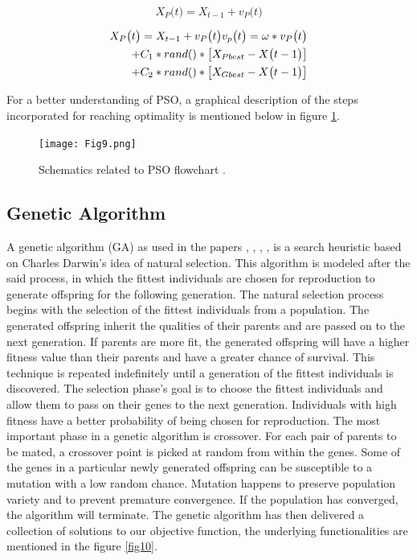 \documentclass[default,iicol]{sn-jnl}
\theoremstyle{thmstyleone}
\theoremstyle{thmstyletwo}
\theoremstyle{thmstylethree}
\begin{document}
\begin{equation}
\displaystyle{X_{P} \big(t\big) = X_{t-1}+ v_{P} \big(t\big)}
\end{equation}

\begin{equation}
\begin{split}
X_{P} \big(t\big) = X_{t-1}+ v_{P} \big(t\big)
 v_{p} \big(t\big) =  \omega  \ast v_{P} \big(t\big) \cr + C_{1} \ast rand() \ast \big[ X_{Pbest} -  X \big(t-1\big) \big] \cr +  C_{2}  \ast rand () 
\ast   \big[ X_{Gbest} - X \big(t-1\big) \big]
\end{split}
\end{equation}
     
For a better understanding of PSO, a graphical description of the steps incorporated for reaching optimality is mentioned below in figure \ref{fig9}.

\begin{figure}[ht]
\centering
\texttt{[image: Fig9.png]}
\caption{Schematics related to PSO flowchart \cite{bib18}.}\label{fig9}
\end{figure}

\subsection{Genetic Algorithm}\label{subsec9}

A genetic algorithm (GA) as used in the papers \cite{bib19}, \cite{bib43}, \cite{bib42}, \cite{bib41}, \cite{bib40} is a search heuristic based on Charles Darwin's idea of natural selection. This algorithm is modeled after the said process, in which the fittest individuals are chosen for reproduction to generate offspring for the following generation. The natural selection process begins with the selection of the fittest individuals from a population. The generated offspring inherit the qualities of their parents and are passed on to the next generation. If parents are more fit, the generated offspring will have a higher fitness value than their parents and have a greater chance of survival. This technique is repeated indefinitely until a generation of the fittest individuals is discovered. The selection phase's goal is to choose the fittest individuals and allow them to pass on their genes to the next generation. Individuals with high fitness have a better probability of being chosen for reproduction. The most important phase in a genetic algorithm is crossover. For each pair of parents to be mated, a crossover point is picked at random from within the genes. Some of the genes in a particular newly generated offspring can be susceptible to a mutation with a low random chance. Mutation happens to preserve population variety and to prevent premature convergence. If the population has converged, the algorithm will terminate. The genetic algorithm has then delivered a collection of solutions to our objective function, the underlying functionalities are mentioned in the figure \ref{fig10}.
\end{document}
